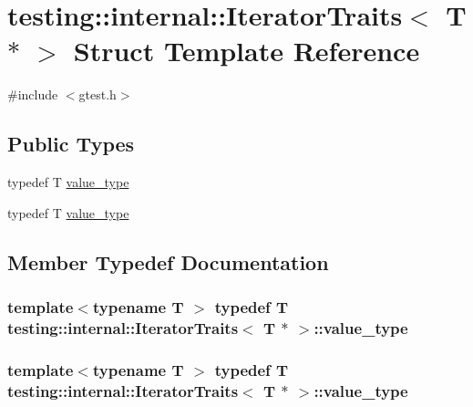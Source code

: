 \hypertarget{structtesting_1_1internal_1_1_iterator_traits_3_01_t_01_5_01_4}{\section{testing\-:\-:internal\-:\-:Iterator\-Traits$<$ T $\ast$ $>$ Struct Template Reference}
\label{structtesting_1_1internal_1_1_iterator_traits_3_01_t_01_5_01_4}
}


{\ttfamily \#include $<$gtest.\-h$>$}

\subsection*{Public Types}
\begin{DoxyCompactItemize}
\item 
typedef T \hyperlink{structtesting_1_1internal_1_1_iterator_traits_3_01_t_01_5_01_4_a7e46869ed36cc5aea898e243d270a8be}{value\-\_\-type}
\item 
typedef T \hyperlink{structtesting_1_1internal_1_1_iterator_traits_3_01_t_01_5_01_4_a7e46869ed36cc5aea898e243d270a8be}{value\-\_\-type}
\end{DoxyCompactItemize}


\subsection{Member Typedef Documentation}
\hypertarget{structtesting_1_1internal_1_1_iterator_traits_3_01_t_01_5_01_4_a7e46869ed36cc5aea898e243d270a8be}{
\subsubsection[{value\-\_\-type}]{\setlength{\rightskip}{0pt plus 5cm}template$<$typename T $>$ typedef T {\bf testing\-::internal\-::\-Iterator\-Traits}$<$ T $\ast$ $>$\-::{\bf value\-\_\-type}}}\label{structtesting_1_1internal_1_1_iterator_traits_3_01_t_01_5_01_4_a7e46869ed36cc5aea898e243d270a8be}
\hypertarget{structtesting_1_1internal_1_1_iterator_traits_3_01_t_01_5_01_4_a7e46869ed36cc5aea898e243d270a8be}{
\subsubsection[{value\-\_\-type}]{\setlength{\rightskip}{0pt plus 5cm}template$<$typename T $>$ typedef T {\bf testing\-::internal\-::\-Iterator\-Traits}$<$ T $\ast$ $>$\-::{\bf value\-\_\-type}}}\label{structtesting_1_1internal_1_1_iterator_traits_3_01_t_01_5_01_4_a7e46869ed36cc5aea898e243d270a8be}


